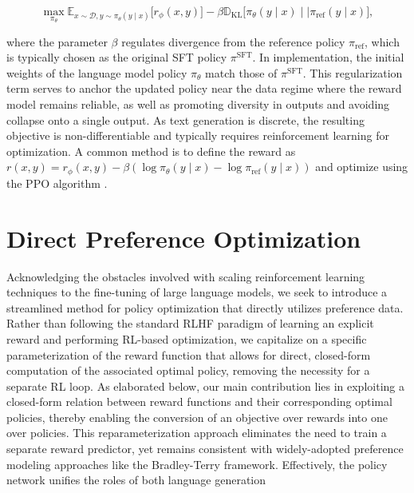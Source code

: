 \begin{equation}\label{eq:RL}
\max_{\pi_{\theta}}  \mathbb{E}_{x\sim \mathcal{D}, y\sim \pi_{\theta}(y \mid x)}\bigl[r_{\phi}(x, y)\bigr] - \beta\mathbb{D}_{\textrm{KL}}\bigl[\pi_{\theta}(y\mid x)\mid \mid \pi_\text{ref}(y\mid x)\bigr],
\end{equation}

where the parameter $\beta$ regulates divergence from the reference policy $\pi_\text{ref}$, which is typically chosen as the original SFT policy $\pi^\text{SFT}$. In implementation, the initial weights of the language model policy $\pi_\theta$ match those of $\pi^\text{SFT}$. This regularization term serves to anchor the updated policy near the data regime where the reward model remains reliable, as well as promoting diversity in outputs and avoiding collapse onto a single output. As text generation is discrete, the resulting objective is non-differentiable and typically requires reinforcement learning for optimization. A common method \citep{ziegler2020finetuning, stiennon2022learning, bai2022training, ouyang2022training} is to define the reward as ${r(x, y) = r_{\phi}(x, y) -\beta (\log \pi_{\theta}(y\mid x) - \log \pi_\text{ref}(y\mid x))}$ and optimize using the PPO algorithm \cite{schulman2017proximal}. 

\section{Direct Preference Optimization}\label{sec:DPO}

Acknowledging the obstacles involved with scaling reinforcement learning techniques to the fine-tuning of large language models, we seek to introduce a streamlined method for policy optimization that directly utilizes preference data. Rather than following the standard RLHF paradigm of learning an explicit reward and performing RL-based optimization, we capitalize on a specific parameterization of the reward function that allows for direct, closed-form computation of the associated optimal policy, removing the necessity for a separate RL loop. As elaborated below, our main contribution lies in exploiting a closed-form relation between reward functions and their corresponding optimal policies, thereby enabling the conversion of an objective over rewards into one over policies. This reparameterization approach eliminates the need to train a separate reward predictor, yet remains consistent with widely-adopted preference modeling approaches like the Bradley-Terry framework. Effectively, the policy network unifies the roles of both language generation

